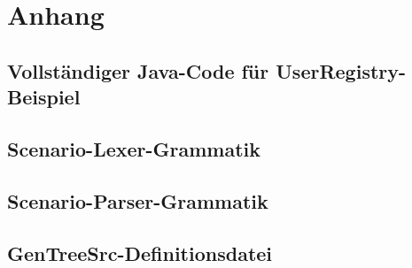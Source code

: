 \chapter{Anhang}\label{ch:appendix}

\section{Vollständiger Java-Code für UserRegistry-Beispiel}\label{sec:user-registry-full}




\section{Scenario-Lexer-Grammatik}\label{sec:scenario-lexer-grammar}

\section{Scenario-Parser-Grammatik}\label{sec:scenario-parser-grammar}

\section{GenTreeSrc-Definitionsdatei}\label{sec:gts-definitions}

